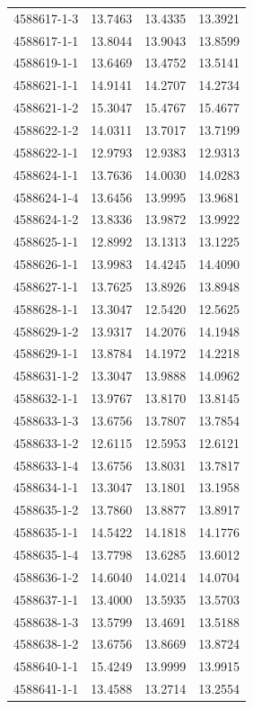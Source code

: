 \begin{longtable}{lrrr}
4588617-1-3 & 13.7463 & 13.4335 & 13.3921 \\
4588617-1-1 & 13.8044 & 13.9043 & 13.8599 \\
4588619-1-1 & 13.6469 & 13.4752 & 13.5141 \\
4588621-1-1 & 14.9141 & 14.2707 & 14.2734 \\
4588621-1-2 & 15.3047 & 15.4767 & 15.4677 \\
4588622-1-2 & 14.0311 & 13.7017 & 13.7199 \\
4588622-1-1 & 12.9793 & 12.9383 & 12.9313 \\
4588624-1-1 & 13.7636 & 14.0030 & 14.0283 \\
4588624-1-4 & 13.6456 & 13.9995 & 13.9681 \\
4588624-1-2 & 13.8336 & 13.9872 & 13.9922 \\
4588625-1-1 & 12.8992 & 13.1313 & 13.1225 \\
4588626-1-1 & 13.9983 & 14.4245 & 14.4090 \\
4588627-1-1 & 13.7625 & 13.8926 & 13.8948 \\
4588628-1-1 & 13.3047 & 12.5420 & 12.5625 \\
4588629-1-2 & 13.9317 & 14.2076 & 14.1948 \\
4588629-1-1 & 13.8784 & 14.1972 & 14.2218 \\
4588631-1-2 & 13.3047 & 13.9888 & 14.0962 \\
4588632-1-1 & 13.9767 & 13.8170 & 13.8145 \\
4588633-1-3 & 13.6756 & 13.7807 & 13.7854 \\
4588633-1-2 & 12.6115 & 12.5953 & 12.6121 \\
4588633-1-4 & 13.6756 & 13.8031 & 13.7817 \\
4588634-1-1 & 13.3047 & 13.1801 & 13.1958 \\
4588635-1-2 & 13.7860 & 13.8877 & 13.8917 \\
4588635-1-1 & 14.5422 & 14.1818 & 14.1776 \\
4588635-1-4 & 13.7798 & 13.6285 & 13.6012 \\
4588636-1-2 & 14.6040 & 14.0214 & 14.0704 \\
4588637-1-1 & 13.4000 & 13.5935 & 13.5703 \\
4588638-1-3 & 13.5799 & 13.4691 & 13.5188 \\
4588638-1-2 & 13.6756 & 13.8669 & 13.8724 \\
4588640-1-1 & 15.4249 & 13.9999 & 13.9915 \\
4588641-1-1 & 13.4588 & 13.2714 & 13.2554 \\

\end{longtable}
